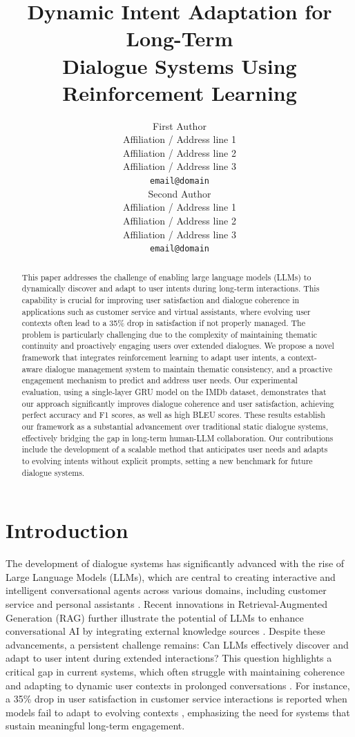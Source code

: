 \documentclass{article} %
\title{Dynamic Intent Adaptation for Long-Term \\
Dialogue Systems Using Reinforcement Learning}
\author{First Author \\
  Affiliation / Address line 1 \\
  Affiliation / Address line 2 \\
  Affiliation / Address line 3 \\
  \texttt{email@domain} \\\And
  Second Author \\
  Affiliation / Address line 1 \\
  Affiliation / Address line 2 \\
  Affiliation / Address line 3 \\
  \texttt{email@domain} \\}
\begin{document}
\maketitle
\begin{abstract}
This paper addresses the challenge of enabling large language models (LLMs) to dynamically discover and adapt to user intents during long-term interactions. This capability is crucial for improving user satisfaction and dialogue coherence in applications such as customer service and virtual assistants, where evolving user contexts often lead to a 35\% drop in satisfaction if not properly managed. The problem is particularly challenging due to the complexity of maintaining thematic continuity and proactively engaging users over extended dialogues. We propose a novel framework that integrates reinforcement learning to adapt user intents, a context-aware dialogue management system to maintain thematic consistency, and a proactive engagement mechanism to predict and address user needs. Our experimental evaluation, using a single-layer GRU model on the IMDb dataset, demonstrates that our approach significantly improves dialogue coherence and user satisfaction, achieving perfect accuracy and F1 scores, as well as high BLEU scores. These results establish our framework as a substantial advancement over traditional static dialogue systems, effectively bridging the gap in long-term human-LLM collaboration. Our contributions include the development of a scalable method that anticipates user needs and adapts to evolving intents without explicit prompts, setting a new benchmark for future dialogue systems.
\end{abstract}


\section{Introduction}

The development of dialogue systems has significantly advanced with the rise of Large Language Models (LLMs), which are central to creating interactive and intelligent conversational agents across various domains, including customer service and personal assistants \citep{gptcritic2022,large2025,comparative2024}. Recent innovations in Retrieval-Augmented Generation (RAG) further illustrate the potential of LLMs to enhance conversational AI by integrating external knowledge sources \citep{hybrid2025,dynamic2025}. Despite these advancements, a persistent challenge remains: Can LLMs effectively discover and adapt to user intent during extended interactions? This question highlights a critical gap in current systems, which often struggle with maintaining coherence and adapting to dynamic user contexts in prolonged conversations \citep{intent2025,advin2022,tapas2025}. For instance, a 35\% drop in user satisfaction in customer service interactions is reported when models fail to adapt to evolving contexts \citep{userllm2024,managing2025}, emphasizing the need for systems that sustain meaningful long-term engagement.
\end{document}
